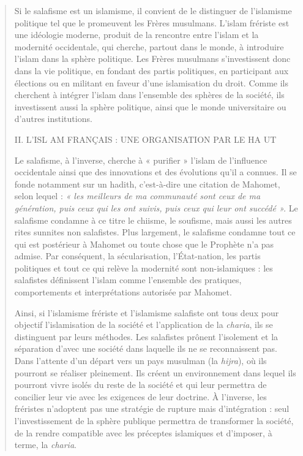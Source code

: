 \begin{quote}
Si le salafisme est un islamisme, il convient de le distinguer de
l'islamisme politique tel que le promeuvent les Frères musulmans.
L'islam frériste est une idéologie moderne, produit de la rencontre
entre l'islam et la modernité occidentale, qui cherche, partout dans le
monde, à introduire l'islam dans la sphère politique. Les Frères
musulmans s'investissent donc dans la vie politique, en fondant des
partis politiques, en participant aux élections ou en militant en faveur
d'une islamisation du droit. Comme ils cherchent à intégrer l'islam dans
l'ensemble des sphères de la société, ils investissent aussi la sphère
politique, ainsi que le monde universitaire ou d'autres institutions.

II. L'ISL AM FRANÇAIS : UNE ORGANISATION PAR LE HA UT

Le salafisme, à l'inverse, cherche à « purifier » l'islam de l'influence
occidentale ainsi que des innovations et des évolutions qu'il a connues.
Il se fonde notamment sur un hadith, c'est-à-dire une citation de
Mahomet, selon lequel : \emph{« les meilleurs de ma communauté sont ceux
de ma génération, puis ceux qui les ont suivis, puis ceux qui leur ont
succédé ».} Le salafisme condamne à ce titre le chiisme, le soufisme,
mais aussi les autres rites sunnites non salafistes. Plus largement, le
salafisme condamne tout ce qui est postérieur à Mahomet ou toute chose
que le Prophète n'a pas admise. Par conséquent, la sécularisation,
l'État-nation, les partis politiques et tout ce qui relève la modernité
sont non-islamiques : les salafistes définissent l'islam comme
l'ensemble des pratiques, comportements et interprétations autorisée par
Mahomet.

Ainsi, si l'islamisme frériste et l'islamisme salafiste ont tous deux
pour objectif l'islamisation de la société et l'application de la
\emph{charia}, ils se distinguent par leurs méthodes. Les salafistes
prônent l'isolement et la séparation d'avec une société dans laquelle
ils ne se reconnaissent pas. Dans l'attente d'un départ vers un pays
musulman (la \emph{hijra}), où ils pourront se réaliser pleinement. Ils
créent un environnement dans lequel ils pourront vivre isolés du reste
de la société et qui leur permettra de concilier leur vie avec les
exigences de leur doctrine. À l'inverse, les fréristes n'adoptent pas
une stratégie de rupture mais d'intégration : seul l'investissement de
la sphère publique permettra de transformer la société, de la rendre
compatible avec les préceptes islamiques et d'imposer, à terme, la
\emph{charia}.


\end{quote}


